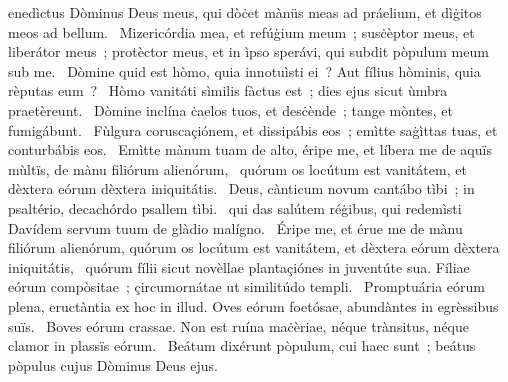 \psalmChapterWithInscription{}
{ }
{%
enedìctus Dòminus Deus meus, qui dòċet mànüs meas ad práelium, et dìġitos meos ad bellum. 
~Mizericórdia mea, et refúġium meum~; susċèptor meus, et liberátor meus~; protèctor meus, et in ìpso sperávi, qui subdit pòpulum meum sub me. 
~Dòmine quid est hòmo, quia innotuìsti ei~? Aut fílius hòminis, quia rèputas eum~? 
~Hòmo vanitáti sìmilis fàctus est~; dies ejus sicut ùmbra praetèreunt. 
~Dòmine inclína ċaelos tuos, et desċènde~; tange mòntes, et fumigábunt. 
~Fùlgura coruscaçiónem, et dissipábis eos~; emìtte saġìttas tuas, et conturbábis eos. 
~Emìtte mànum tuam de alto, éripe me, et líbera me de aquïs mùltïs, de mànu filiórum alienórum, 
~quórum os locútum est vanitátem, et dèxtera eórum dèxtera iniquitátis. 
~Deus, cànticum novum cantábo tìbi~; in psaltério, decachórdo psallem tìbi. 
~qui das salútem réġibus, qui redemìsti Davídem servum tuum de glàdio malígno. 
~Éripe me, et érue me de mànu filiórum alienórum, quórum os locútum est vanitátem, et dèxtera eórum dèxtera iniquitátis, 
~quórum fílii sicut novèllae plantaçiónes in juventúte sua. Fíliae eórum compòsitae~; çircumornátae ut similitúdo templi. 
~Promptuária eórum plena, eructàntia ex hoc in illud. Oves eórum foetósae, abundàntes in egrèssibus suïs. 
~Boves eórum crassae. Non est ruína maċèriae, néque trànsitus, néque clamor in plassïs eórum. 
~Beátum dixérunt pòpulum, cui haec sunt~; beátus pòpulus cujus Dòminus Deus ejus. 
}
